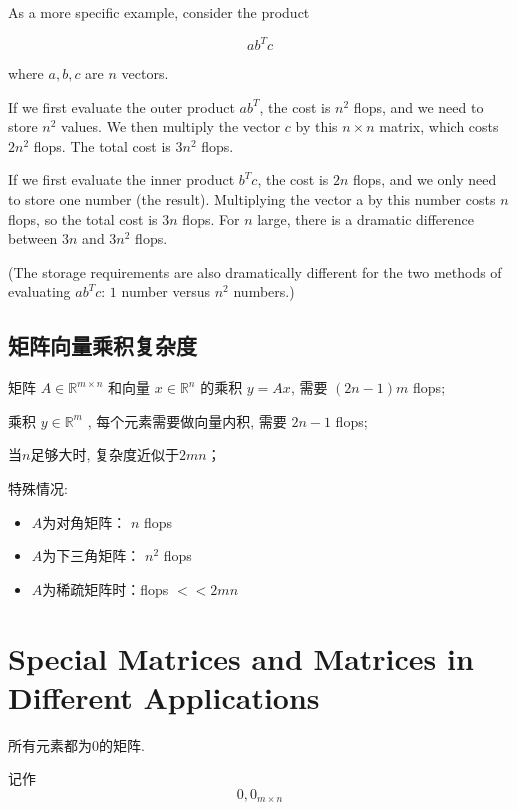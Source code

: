 \begin{example}
    As a more specific example, consider the product 
    
    $$ a b^{T} c $$
    
    where $ a, b, c $ are $ n $ vectors. 
    
    If we first evaluate the outer product $ a b^{T} $, the cost is $ n^{2} $ flops, and we need to store $ n^{2} $ values. We then multiply the vector $ c $ by this $ n \times n $ matrix, which costs $ 2 n^{2} $ flops. The total cost is $ 3 n^{2} $ flops.

    If we first evaluate the inner product $b^Tc$, the cost is $2n$ flops, and we only need to store one number (the result). Multiplying the vector a by this number costs $n$ flops, so the total cost is $3n$ flops. For $n$ large, there is a dramatic difference between $3n$ and $3n^2$ flops.

    (The storage requirements are also dramatically different for the two methods of evaluating $ab^Tc$: $1$ number versus $n^2$ numbers.)
\end{example}

\subsection{矩阵向量乘积复杂度}

矩阵 $ A \in \mathbb{R}^{m \times n} $ 和向量 $ x \in \mathbb{R}^{n} $ 的乘积 $ {y}={A} x $, 需要 $ (2 {n}-1) {m} $ flops;

乘积 $ y \in \mathbb{R}^{m} $ , 每个元素需要做向量内积, 需要 $ 2 n-1 $ flops;

当$n$足够大时, 复杂度近似于$2mn$；

特殊情况:

\begin{itemize}
    \item $A$为对角矩阵： $ {n} $ flops
    \item $A$为下三角矩阵： $ n^{2} $ flops
    \item $A$为稀疏矩阵时：flops $ <<2 m n $
\end{itemize}


\section{Special Matrices and Matrices in Different Applications}

\begin{definition}
    所有元素都为0的矩阵.

    记作$$0, 0_{m \times n} $$
\end{definition}

